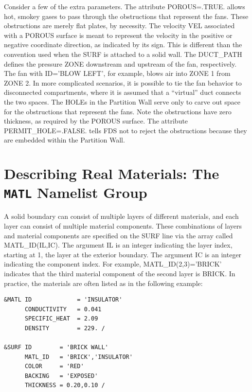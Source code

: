 \documentclass[11pt]{book}
\begin{document}
\noindent
Consider a few of the extra parameters. The attribute {\ct POROUS=.TRUE.} allows hot, smokey gases to pass through the obstructions that represent the fans. These obstructions
are merely flat plates, by necessity. The velocity {\ct VEL} associated with a {\ct POROUS} surface is meant to represent the velocity in the positive or negative coordinate
direction, as indicated by its sign. This is different than the convention used when the {\ct SURF} is attached to a solid wall. The {\ct DUCT\_PATH} defines the pressure
{\ct ZONE} downstream and upstream of the fan, respectively. The fan with {\ct ID='BLOW LEFT'}, for example, blows air into {\ct ZONE} 1 from {\ct ZONE} 2.
In more complicated scenarios,
it is possible to tie the fan behavior to disconnected compartments, where it is assumed that a ``virtual'' duct connects the two spaces. The {\ct HOLE}s in the Partition Wall serve
only to carve out space for the obstructions that represent the fans. Note the obstructions have zero thickness, as required by the {\ct POROUS} surface. The attribute
{\ct PERMIT\_HOLE=.FALSE.} tells FDS not to reject the obstructions because they are embedded within the Partition Wall.












\clearpage


\section{Describing Real Materials: The \texorpdfstring{{\tt MATL}}{MATL} Namelist Group}
\label{info:MATL}

A solid boundary can consist of multiple layers of different materials, and each layer can consist of multiple material
components. These combinations of layers and material components are specified on the {\ct SURF} line via the array called {\ct MATL\_ID(IL,IC)}. The
argument {\ct IL} is an integer indicating the layer index, starting at 1, the layer at the exterior boundary. The argument {\ct IC} is an integer
indicating the component index. For example, {\ct MATL\_ID(2,3)='BRICK'} indicates that the third material component of the second layer is
{\ct BRICK}. In practice, the materials are often listed as in the following example:

\footnotesize
\begin{verbatim}
&MATL ID             = 'INSULATOR'
      CONDUCTIVITY   = 0.041
      SPECIFIC_HEAT  = 2.09
      DENSITY        = 229. /

&SURF ID        = 'BRICK WALL'
      MATL_ID   = 'BRICK','INSULATOR'
      COLOR     = 'RED'
      BACKING   = 'EXPOSED'
      THICKNESS = 0.20,0.10 /

\end{verbatim}
\normalsize
\end{document}
